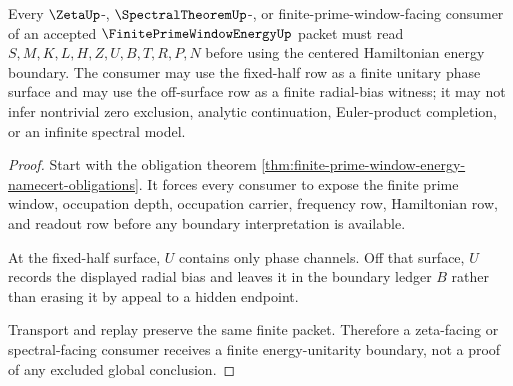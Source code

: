 \begin{theorem}
\label{thm:finite-prime-window-energy-unitary-boundary}
Every $\ZetaUp$-, $\SpectralTheoremUp$-, or finite-prime-window-facing consumer of an accepted $\FinitePrimeWindowEnergyUp$ packet must read $S,M,K,L,H,Z,U,B,T,R,P,N$ before using the centered Hamiltonian energy boundary. The consumer may use the fixed-half row as a finite unitary phase surface and may use the off-surface row as a finite radial-bias witness; it may not infer nontrivial zero exclusion, analytic continuation, Euler-product completion, or an infinite spectral model.
\end{theorem}
\begin{proof}
Start with the obligation theorem \autoref{thm:finite-prime-window-energy-namecert-obligations}. It forces every consumer to expose the finite prime window, occupation depth, occupation carrier, frequency row, Hamiltonian row, and readout row before any boundary interpretation is available.

At the fixed-half surface, $U$ contains only phase channels. Off that surface, $U$ records the displayed radial bias and leaves it in the boundary ledger $B$ rather than erasing it by appeal to a hidden endpoint.

Transport and replay preserve the same finite packet. Therefore a zeta-facing or spectral-facing consumer receives a finite energy-unitarity boundary, not a proof of any excluded global conclusion.
\end{proof}




